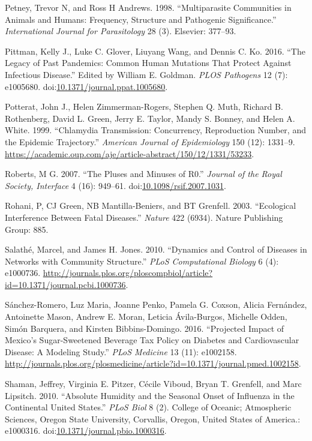 \documentclass[]{book}
\theoremstyle{definition}
\theoremstyle{definition}
\theoremstyle{definition}
\theoremstyle{remark}
\begin{document}
\hypertarget{ref-petney98}{}
Petney, Trevor N, and Ross H Andrews. 1998. ``Multiparasite Communities
in Animals and Humans: Frequency, Structure and Pathogenic
Significance.'' \emph{International Journal for Parasitology} 28 (3).
Elsevier: 377--93.

\hypertarget{ref-pittman16}{}
Pittman, Kelly J., Luke C. Glover, Liuyang Wang, and Dennis C. Ko. 2016.
``The Legacy of Past Pandemics: Common Human Mutations That Protect
Against Infectious Disease.'' Edited by William E. Goldman. \emph{PLOS
Pathogens} 12 (7): e1005680.
doi:\href{https://doi.org/10.1371/journal.ppat.1005680}{10.1371/journal.ppat.1005680}.

\hypertarget{ref-potterat99}{}
Potterat, John J., Helen Zimmerman-Rogers, Stephen Q. Muth, Richard B.
Rothenberg, David L. Green, Jerry E. Taylor, Mandy S. Bonney, and Helen
A. White. 1999. ``Chlamydia Transmission: Concurrency, Reproduction
Number, and the Epidemic Trajectory.'' \emph{American Journal of
Epidemiology} 150 (12): 1331--9.
\url{https://academic.oup.com/aje/article-abstract/150/12/1331/53233}.

\hypertarget{ref-roberts07}{}
Roberts, M G. 2007. ``The Pluses and Minuses of R0.'' \emph{Journal of
the Royal Society, Interface} 4 (16): 949--61.
doi:\href{https://doi.org/10.1098/rsif.2007.1031}{10.1098/rsif.2007.1031}.

\hypertarget{ref-rohani03}{}
Rohani, P, CJ Green, NB Mantilla-Beniers, and BT Grenfell. 2003.
``Ecological Interference Between Fatal Diseases.'' \emph{Nature} 422
(6934). Nature Publishing Group: 885.

\hypertarget{ref-salathe10}{}
Salathé, Marcel, and James H. Jones. 2010. ``Dynamics and Control of
Diseases in Networks with Community Structure.'' \emph{PLoS
Computational Biology} 6 (4): e1000736.
\url{http://journals.plos.org/ploscompbiol/article?id=10.1371/journal.pcbi.1000736}.

\hypertarget{ref-sanchez-romero16}{}
Sánchez-Romero, Luz Maria, Joanne Penko, Pamela G. Coxson, Alicia
Fernández, Antoinette Mason, Andrew E. Moran, Leticia Ávila-Burgos,
Michelle Odden, Simón Barquera, and Kirsten Bibbins-Domingo. 2016.
``Projected Impact of Mexico's Sugar-Sweetened Beverage Tax Policy on
Diabetes and Cardiovascular Disease: A Modeling Study.'' \emph{PLoS
Medicine} 13 (11): e1002158.
\url{http://journals.plos.org/plosmedicine/article?id=10.1371/journal.pmed.1002158}.

\hypertarget{ref-shaman10}{}
Shaman, Jeffrey, Virginia E. Pitzer, Cécile Viboud, Bryan T. Grenfell,
and Marc Lipsitch. 2010. ``Absolute Humidity and the Seasonal Onset of
Influenza in the Continental United States.'' \emph{PLoS Biol} 8 (2).
College of Oceanic; Atmospheric Sciences, Oregon State University,
Corvallis, Oregon, United States of America.: e1000316.
doi:\href{https://doi.org/10.1371/journal.pbio.1000316}{10.1371/journal.pbio.1000316}.
\end{document}
